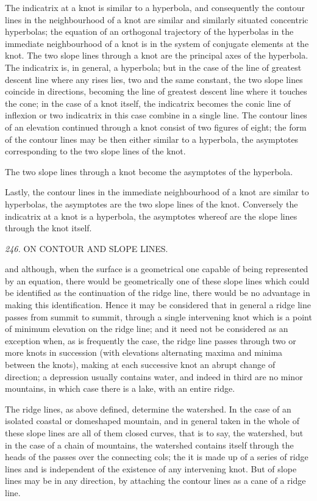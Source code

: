\documentclass[11pt,a4paper]{article}
\begin{document}
The indicatrix at a knot is similar to a hyperbola, and consequently the contour lines in the neighbourhood of a knot are similar and similarly situated concentric hyperbolas; the equation of an orthogonal trajectory of the hyperbolas in the immediate neighbourhood of a knot is in the system of conjugate elements at the knot. The two slope lines through a knot are the principal axes of the hyperbola. The indicatrix is, in general, a hyperbola; but in the case of the line of greatest descent line where any rises lies, two and the same constant, the two slope lines coincide in directions, becoming the line of greatest descent line where it touches the cone; in the case of a knot itself, the indicatrix becomes the conic line of inflexion or two indicatrix in this case combine in a single line. The contour lines of an elevation continued through a knot consist of two figures of eight; the form of the contour lines may be then either similar to a hyperbola, the asymptotes corresponding to the two slope lines of the knot.

The two slope lines through a knot become the asymptotes of the hyperbola.

Lastly, the contour lines in the immediate neighbourhood of a knot are similar to hyperbolas, the asymptotes are the two slope lines of the knot. Conversely the indicatrix at a knot is a hyperbola, the asymptotes whereof are the slope lines through the knot itself.

\setcounter{page}{111}

\noindent\textit{246.} \quad ON CONTOUR AND SLOPE LINES.

and although, when the surface is a geometrical one capable of being represented by an equation, there would be geometrically one of these slope lines which could be identified as the continuation of the ridge line, there would be no advantage in making this identification. Hence it may be considered that in general a ridge line passes from summit to summit, through a single intervening knot which is a point of minimum elevation on the ridge line; and it need not be considered as an exception when, as is frequently the case, the ridge line passes through two or more knots in succession (with elevations alternating maxima and minima between the knots), making at each successive knot an abrupt change of direction; a depression usually contains water, and indeed in third are no minor mountains, in which case there is a lake, with an entire ridge.

The ridge lines, as above defined, determine the watershed. In the case of an isolated coastal or domeshaped mountain, and in general taken in the whole of these slope lines are all of them closed curves, that is to say, the watershed, but in the case of a chain of mountains, the watershed contains itself through the heads of the passes over the connecting cols; the it is made up of a series of ridge lines and is independent of the existence of any intervening knot. But of slope lines may be in any direction, by attaching the contour lines as a cane of a ridge line.
\end{document}
